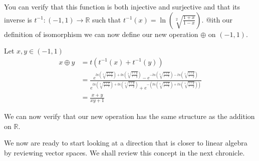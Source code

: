 \documentclass{report}
\begin{document}
    You can verify that this function is both injective and surjective and that its inverse is $t^{-1}: (-1, 1) \rightarrow \mathbb{R}$ such that $t^{-1}(x) = \ln(\sqrt[2]{\frac{1+x}{1-x}})$. @ith our definition of isomorphism we can now define our new operation $\oplus$ on $(-1,1)$.

    Let $x, y \in (-1, 1)$
    \begin{align*}
        x \oplus y &= t(t^{-1}(x) + t^{-1}(y))\\
        &=\frac{e^{ln(\sqrt[2]{\frac{1+x}{1-x}}) + ln(\sqrt[2]{\frac{1+y}{1-y}})}-e^{-ln(\sqrt[2]{\frac{1+x}{1-x}}) - ln(\sqrt[2]{\frac{1+y}{1-y}})}}{e^{ln(\sqrt[2]{\frac{1+x}{1-x}}) + ln(\sqrt[2]{\frac{1+y}{1-y}})}+e^{-(ln(\sqrt[2]{\frac{1+x}{1-x}}) + ln(\sqrt[2]{\frac{1+y}{1-y}}))}}\\
        &= \frac{x+y}{xy+1}
    \end{align*}

    We can now verify that our new operation has the same structure as the addition on $\mathbb{R}$.

    We now are ready to start looking at a direction that is closer to linear algebra by reviewing vector spaces. We shall review this concept in the next chronicle.
\end{document}
